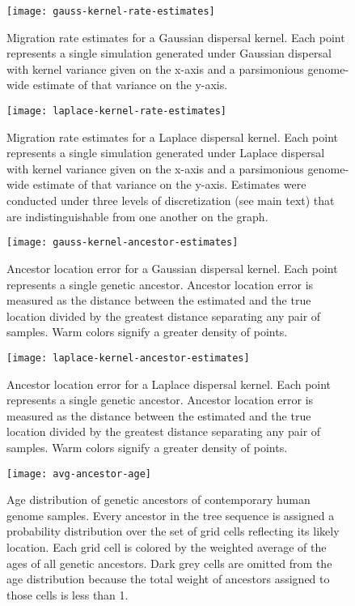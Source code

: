 \begin{figure}[h]
\centering
\texttt{[image: gauss-kernel-rate-estimates]}
\caption{Migration rate estimates for a Gaussian dispersal kernel. Each point
represents a single simulation generated under Gaussian dispersal with kernel
variance given on the x-axis and a parsimonious genome-wide estimate of that
variance on the y-axis.
}
\label{fig:gauss-kernel-rate-estimates}
\end{figure}

\begin{figure}[h]
\centering
\texttt{[image: laplace-kernel-rate-estimates]}
\caption{Migration rate estimates for a Laplace dispersal kernel. Each point
represents a single simulation generated under Laplace dispersal with kernel
variance given on the x-axis and a parsimonious genome-wide estimate of that
variance on the y-axis. Estimates were conducted under three levels of 
discretization (see main text) that are indistinguishable from one another on
the graph.
}
\label{fig:lapl-kernel-rate-estimates}
\end{figure}

\begin{figure}[h]
\centering
\texttt{[image: gauss-kernel-ancestor-estimates]}
\caption{Ancestor location error for a Gaussian dispersal kernel. Each point
represents a single genetic ancestor. Ancestor location error is measured as
the distance between the estimated and the true location divided by the greatest
distance separating any pair of samples. Warm colors signify a greater density
of points.
}
\label{fig:gauss-kernel-ancestor-estimates}
\end{figure}

\begin{figure}[h]
\centering
\texttt{[image: laplace-kernel-ancestor-estimates]}
\caption{Ancestor location error for a Laplace dispersal kernel. Each point
represents a single genetic ancestor. Ancestor location error is measured as
the distance between the estimated and the true location divided by the greatest
distance separating any pair of samples. Warm colors signify a greater density
of points.
}
\label{fig:lapl-kernel-ancestor-estimates}
\end{figure}

\begin{figure}[h]
\centering
\texttt{[image: avg-ancestor-age]}
\caption{Age distribution of genetic ancestors of contemporary human genome
samples. Every ancestor in the tree sequence is assigned a probability distribution 
over the set of grid cells reflecting its likely location. Each grid cell is 
colored by the weighted average of the ages of all genetic ancestors. Dark grey 
cells are omitted from the age distribution because the total weight of ancestors 
assigned to those cells is less than 1.}
\label{fig:avg-ancestor-age}
\end{figure}